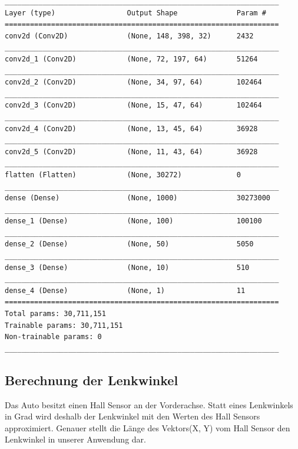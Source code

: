 \documentclass[a4paper, 12pt]{scrartcl}
\begin{document}
			\begin{verbatim}		
_________________________________________________________________
Layer (type)                 Output Shape              Param #   
=================================================================
conv2d (Conv2D)              (None, 148, 398, 32)      2432      
_________________________________________________________________
conv2d_1 (Conv2D)            (None, 72, 197, 64)       51264     
_________________________________________________________________
conv2d_2 (Conv2D)            (None, 34, 97, 64)        102464    
_________________________________________________________________
conv2d_3 (Conv2D)            (None, 15, 47, 64)        102464    
_________________________________________________________________
conv2d_4 (Conv2D)            (None, 13, 45, 64)        36928     
_________________________________________________________________
conv2d_5 (Conv2D)            (None, 11, 43, 64)        36928     
_________________________________________________________________
flatten (Flatten)            (None, 30272)             0         
_________________________________________________________________
dense (Dense)                (None, 1000)              30273000  
_________________________________________________________________
dense_1 (Dense)              (None, 100)               100100    
_________________________________________________________________
dense_2 (Dense)              (None, 50)                5050      
_________________________________________________________________
dense_3 (Dense)              (None, 10)                510       
_________________________________________________________________
dense_4 (Dense)              (None, 1)                 11        
=================================================================
Total params: 30,711,151
Trainable params: 30,711,151
Non-trainable params: 0
_________________________________________________________________
			\end{verbatim}
			
			\subsection{Berechnung der Lenkwinkel}
			Das Auto besitzt einen Hall Sensor an der Vorderachse. Statt eines Lenkwinkels in Grad wird deshalb der Lenkwinkel mit den Werten des Hall Sensors approximiert. Genauer stellt die Länge des Vektors(X, Y) vom Hall Sensor den Lenkwinkel in unserer Anwendung dar.
			
\end{document}
